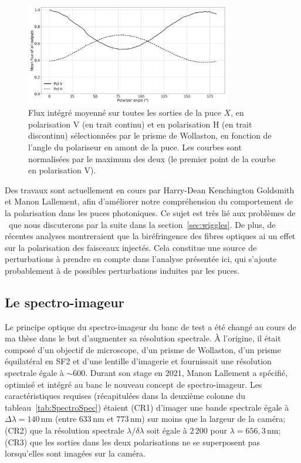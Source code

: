 \begin{figure}[ht!]
    \centering
    \includegraphics[width=0.8\textwidth]{Figure_Chap2/20221019_5TC_PX_OutputFlux_Mean_VS_Angle.png}
    \caption[Flux intégré moyenné sur toutes les sorties de la puce $X$ en fonction de l'angle du polariseur, dans les deux polarisations.]{Flux intégré moyenné sur toutes les sorties de la puce $X$, en polarisation V (en trait continu) et en polarisation H (en trait discontinu) sélectionnées par le prisme de Wollaston, en fonction de l'angle du polariseur en amont de la puce. Les courbes sont normalisées par le maximum des deux (le premier point de la courbe en polarisation V).}
    \label{fig:PolaRotation}
\end{figure}

Des travaux sont actuellement en cours par Harry-Dean Kenchington Goldsmith et Manon Lallement, afin d'améliorer notre compréhension du comportement de la polarisation dans les puces photoniques. Ce sujet est très lié aux problèmes de \wiggles~que nous discuterons par la suite dans la section~\ref{sec:wiggles}. De plus, de récentes analyses montreraient que la biréfringence des fibres optiques ai un effet sur la polarisation des faisceaux injectés. Cela constitue une source de perturbations à prendre en compte dans l'analyse présentée ici, qui s'ajoute probablement à de possibles perturbations induites par les puces.


\subsection{Le spectro-imageur}
\label{sec:InstruSpectro}

Le principe optique du spectro-imageur du banc de test a été changé au cours de ma thèse dans le but d'augmenter sa résolution spectrale. À l'origine, il était composé d'un objectif de microscope, d'un prisme de Wollaston, d'un prisme équilatéral en SF2 et d'une lentille d'imagerie et fournissait une résolution spectrale égale à $\sim 600$. Durant son stage en 2021, Manon Lallement a spécifié, optimisé et intégré au banc le nouveau concept de spectro-imageur. Les caractéristiques requises (récapitulées dans la deuxième colonne du tableau~\ref{tab:SpectroSpec}) étaient (CR1) d'imager une bande spectrale égale à $\Delta \lambda = 140 \,$nm (entre $633 \,$nm et $773 \,$nm) sur moins que la largeur de la caméra; (CR2) que la résolution spectrale $\lambda / \delta \lambda$ soit égale à $2\,200$ pour $\lambda = 656,3 \,$nm; (CR3) que les sorties dans les deux polarisations ne se superposent pas lorsqu'elles sont imagées sur la caméra.

